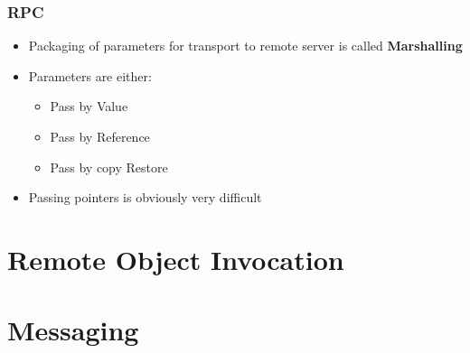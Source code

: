\documentclass{beamer}
\begin{document}
     \begin{frame}
     	\frametitle{RPC}
     	
     	\begin{itemize}
     		\item Packaging of parameters for transport to remote server is called \textbf{Marshalling}
     		\item Parameters are either:
     		\begin{itemize}
     			\item Pass by Value
     			\item Pass by Reference
     			\item Pass by copy Restore
     		\end{itemize}
     		\item Passing pointers is obviously very difficult
     	\end{itemize}
     \end{frame}
  
\section{Remote Object Invocation}
\section{Messaging}
\end{document}
